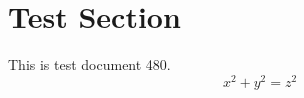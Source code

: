 \documentclass{article}
\begin{document}
\section{Test Section}
This is test document 480.
\begin{equation}
x^2 + y^2 = z^2
\end{equation}
\end{document}

